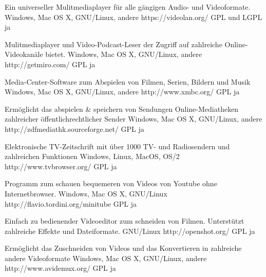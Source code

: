 \documentclass[11pt,a4paper,landscape,twocolumn]{article}
\begin{document}


{Ein universeller Mulitmediaplayer für alle gängigen Audio- und Videoformate.}
{Windows, Mac OS X, GNU/Linux, andere}
{https://videolan.org/}
{GPL und LGPL}
{ja}

{Mulitmediaplayer und Video-Podcast-Leser der Zugriff auf zahlreiche Online-Videokanäle bietet.}
{Windows, Mac OS X, GNU/Linux, andere}
{http://getmiro.com/}
{GPL}
{ja}

{Media-Center-Software zum Abspielen von Filmen, Serien, Bildern und Musik}
{Windows, Mac OS X, GNU/Linux, andere}
{http://www.xmbc.org/}
{GPL}
{ja}

{Ermöglicht das abspielen \& speichern von Sendungen Online-Mediatheken zahlreicher öffentlichrechtlicher Sender}
{Windows, Mac OS X, GNU/Linux, andere}
{http://zdfmediathk.sourceforge.net/}
{GPL}
{ja}


\newpage %


{Elektronische TV-Zeitschrift mit über 1000 TV- und Radiosendern und zahlreichen Funktionen}
{Windows, Linux, MacOS, OS/2}
{http://www.tvbrowser.org/}
{GPL}
{ja}

{Programm zum schauen bequemeren von Videos von Youtube ohne Internetbrowser.}
{Windows, Mac OS X, GNU/Linux}
{http://flavio.tordini.org/minitube}
{GPL}
{ja}

{Einfach zu bedienender Videoeditor zum schneiden von Filmen. Unterstützt zahlreiche Effekte und Dateiformate.}
{GNU/Linux}
{http://openshot.org/}
{GPL}
{ja}

{Ermöglicht das Zuschneiden von Videos und das Konvertieren in zahlreiche andere Videoformate}
{Windows, Mac OS X, GNU/Linux, andere}
{http://www.avidemux.org/}
{GPL}
{ja}
\end{document}
